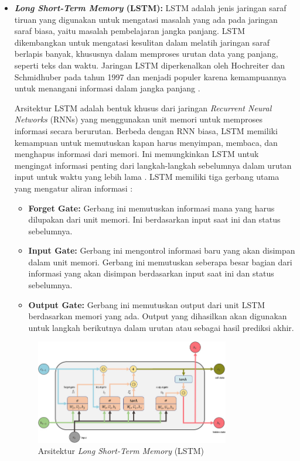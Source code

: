 \documentclass[12pt,a4paper]{article}
\begin{document}
\begin{itemize}
    \item \textbf{\textit{Long Short-Term Memory} (LSTM):} LSTM adalah jenis jaringan saraf tiruan yang digunakan untuk mengatasi masalah yang ada pada jaringan saraf biasa, yaitu masalah pembelajaran jangka panjang. LSTM dikembangkan untuk mengatasi kesulitan dalam melatih jaringan saraf berlapis banyak, khususnya dalam memproses urutan data yang panjang, seperti teks dan waktu. Jaringan LSTM diperkenalkan oleh Hochreiter dan Schmidhuber pada tahun 1997 dan menjadi populer karena kemampuannya untuk menangani informasi dalam jangka panjang \cite{hochreiter1997long}.

    Arsitektur LSTM adalah bentuk khusus dari jaringan \textit{Recurrent Neural Networks} (RNNs) yang menggunakan unit memori untuk memproses informasi secara berurutan. Berbeda dengan RNN biasa, LSTM memiliki kemampuan untuk memutuskan kapan harus menyimpan, membaca, dan menghapus informasi dari memori. Ini memungkinkan LSTM untuk mengingat informasi penting dari langkah-langkah sebelumnya dalam urutan input untuk waktu yang lebih lama \cite{Graves}. LSTM memiliki tiga gerbang utama yang mengatur aliran informasi \cite{hochreiter1997long}:
    \begin{itemize}
        \item \textbf{Forget Gate:} Gerbang ini memutuskan informasi mana yang harus dilupakan dari unit memori. Ini berdasarkan input saat ini dan status sebelumnya.
        \item \textbf{Input Gate:} Gerbang ini mengontrol informasi baru yang akan disimpan dalam unit memori. Gerbang ini memutuskan seberapa besar bagian dari informasi yang akan disimpan berdasarkan input saat ini dan status sebelumnya.
        \item \textbf{Output Gate:} Gerbang ini memutuskan output dari unit LSTM berdasarkan memori yang ada. Output yang dihasilkan akan digunakan untuk langkah berikutnya dalam urutan atau sebagai hasil prediksi akhir.
    \end{itemize}

    \begin{figure}[H]
        \centering
        \includegraphics[width=0.8\textwidth]{images/lstm.jpg}
        \caption{Arsitektur \textit{Long Short-Term Memory} (LSTM)}
        \label{fig:lstm}
    \end{figure}


\end{itemize}
\end{document}
